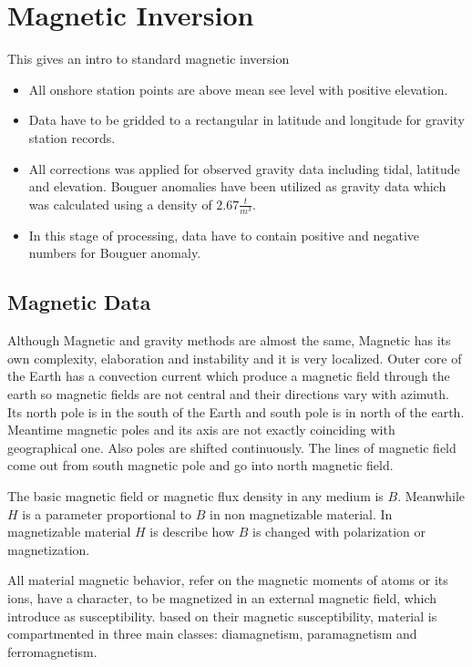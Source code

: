 \chapter{Magnetic Inversion}\label{Chp:cook:magnetic inversion}
This gives an intro to standard magnetic inversion


\begin{itemize}
\item All onshore station points are above mean see level with positive
elevation.

\item Data have to be gridded to a rectangular in latitude and longitude
for gravity station records.

\item All corrections was applied for observed gravity data including
tidal, latitude and elevation. Bouguer anomalies have been utilized as
gravity data which was calculated using a density of $2.67 \frac{t}{m^3}$.

\item In this stage of processing, data have to contain positive and
negative numbers for Bouguer anomaly.
\end{itemize}

\section{Magnetic Data} 

Although Magnetic and gravity methods are almost the same, Magnetic has its own complexity, elaboration and instability and it is very localized. Outer core of the Earth has a convection current which produce a magnetic field through the earth so magnetic fields are not central and their directions vary with azimuth. Its north pole is in the south of the Earth and south pole is in north of the earth. Meantime magnetic poles and its axis are not exactly coinciding with geographical one. Also poles are shifted continuously. The lines of magnetic field come out from south magnetic pole and go into north magnetic field. 

The basic magnetic field or magnetic flux density in any medium is $B$. Meanwhile $H$ is a parameter proportional to $B$ in non magnetizable material. In magnetizable material $H$ is describe how $B$ is changed with polarization or magnetization.

All material magnetic behavior, refer on the magnetic moments of atoms or its ions, have a character, to be magnetized in an external magnetic field, which introduce as susceptibility. based on their magnetic susceptibility, material is compartmented in three main classes: diamagnetism, paramagnetism and ferromagnetism.

